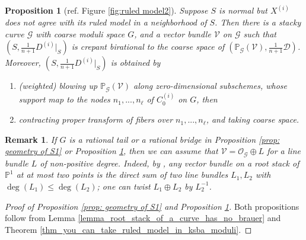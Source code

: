 \documentclass[a4paper,12pt]{amsart}
\newcommand{\bP}{{\mathbb P}}
\newcommand{\cG}{{\mathcal{G}}}
\newcommand{\cO}{{\mathcal{O}}}
\newcommand{\cV}{{\mathcal{V}}}
\newcommand\cD{{\mathcal{D}}}
\newtheorem{prop}[theorem]{Proposition}
\newtheorem{remark}[theorem]{Remark}
\theoremstyle{definition}
\theoremstyle{remark}
\begin{document}
\begin{prop}[ref. Figure \ref{fig:ruled model2}]\label{prop: geometry of S2}
    Suppose $S$ is normal but $X^{(i)}$ does not agree with its ruled model in a neighborhood of $S$. Then there is a stacky curve $\cG$ with coarse moduli space $G$, and a vector bundle $\cV$ on $\cG$ such that $(S,\frac{1}{n+1}D^{(i)}|_S)$ is crepant birational to the coarse space of $(\bP_{\cG}(\cV),\frac{1}{n+1}\cD)$. Moreover, $(S,\frac{1}{n+1}D^{(i)}|_S)$ is obtained by
    \begin{enumerate}
        \item (weighted) blowing up $\bP_\cG(\cV)$ along zero-dimensional subschemes, whose support map to the nodes $n_1,...,n_{\ell}$ of $C^{(i)}_0$ on $G$, then
        \item contracting proper transform of fibers over $n_1,...,n_{\ell}$, and taking coarse space. 
    \end{enumerate}
\end{prop}

\begin{remark}\textup{
  If $G$ is a rational tail or a rational bridge in Proposition \ref{prop: geometry of S1} or Proposition \ref{prop: geometry of S2}, then we can assume that $\cV=\cO_{\cG}\oplus L$ for a line bundle $L$ of non-positive degree. Indeed, by \cite[Theorem 2.4]{martens2012variations}, any vector bundle on a root stack of $\bP^1$ at at most two points is the direct sum of two line bundles $L_1,L_2$ with $\deg(L_1)\le \deg(L_2)$; one can twist $L_1\oplus L_2$ by $L_2^{-1}$.}
\end{remark}

\begin{proof}[Proof of Proposition \ref{prop: geometry of S1} and Proposition \ref{prop: geometry of S2}]
   Both propositions follow from Lemma \ref{lemma_root_stack_of_a_curve_has_no_brauer} and Theorem \ref{thm_you_can_take_ruled_model_in_ksba_moduli}.
\end{proof}
\end{document}
